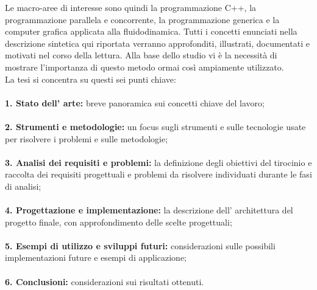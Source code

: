 Le macro-aree di interesse sono quindi la programmazione C++, la programmazione parallela e concorrente, la programmazione generica e la computer grafica applicata alla fluidodinamica. Tutti i concetti enunciati nella descrizione sintetica qui riportata verranno approfonditi, illustrati, documentati e motivati nel corso della lettura. Alla base dello studio vi \`e la necessit\`a di mostrare l'importanza di questo metodo ormai cos\`i ampiamente utilizzato.\\
La tesi si concentra su questi sei punti chiave:\\ \\
\textbf{1. Stato dell' arte:} breve panoramica sui concetti chiave del lavoro;\\ \\
\textbf{2. Strumenti e metodologie: }un focus sugli strumenti e sulle tecnologie usate per risolvere i problemi e sulle metodologie;\\ \\
\textbf{3. Analisi dei requisiti e problemi:} la definizione degli obiettivi del tirocinio e raccolta dei requisiti progettuali e problemi da risolvere individuati durante le fasi di analisi;\\ \\
\textbf{4. Progettazione e implementazione: }la descrizione dell' architettura del progetto finale, con approfondimento delle scelte progettuali;\\ \\
\textbf{5. Esempi di utilizzo e sviluppi futuri:} considerazioni sulle possibili implementazioni future e esempi di applicazione;\\ \\
\textbf{6. Conclusioni: }considerazioni sui risultati ottenuti.
\vspace{0.5cm}
